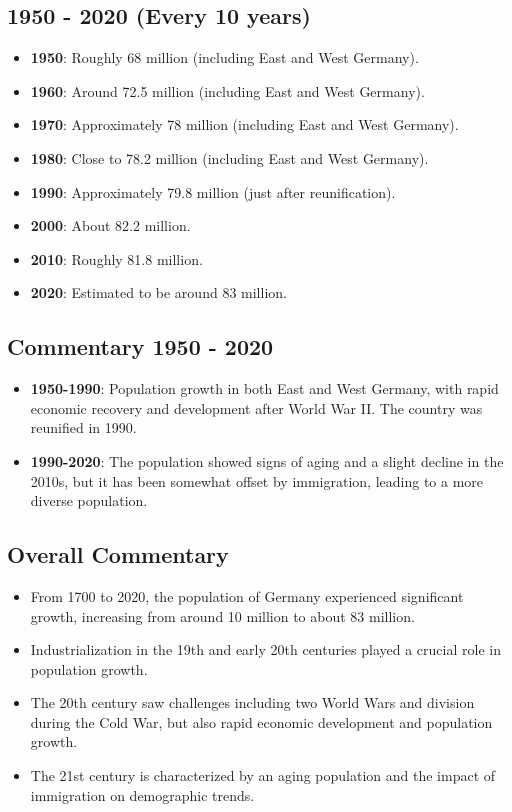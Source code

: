\subsection*{1950 - 2020 (Every 10 years)}
\begin{itemize}
    \item \textbf{1950}: Roughly 68 million (including East and West Germany).
    \item \textbf{1960}: Around 72.5 million (including East and West Germany).
    \item \textbf{1970}: Approximately 78 million (including East and West Germany).
    \item \textbf{1980}: Close to 78.2 million (including East and West Germany).
    \item \textbf{1990}: Approximately 79.8 million (just after reunification).
    \item \textbf{2000}: About 82.2 million.
    \item \textbf{2010}: Roughly 81.8 million.
    \item \textbf{2020}: Estimated to be around 83 million.
\end{itemize}

\subsection*{Commentary 1950 - 2020}
\begin{itemize}
    \item \textbf{1950-1990}: Population growth in both East and West Germany, with rapid economic recovery and development after World War II. The country was reunified in 1990.
    \item \textbf{1990-2020}: The population showed signs of aging and a slight decline in the 2010s, but it has been somewhat offset by immigration, leading to a more diverse population.
\end{itemize}

\subsection*{Overall Commentary}
\begin{itemize}
    \item From 1700 to 2020, the population of Germany experienced significant growth, increasing from around 10 million to about 83 million.
    \item Industrialization in the 19th and early 20th centuries played a crucial role in population growth.
    \item The 20th century saw challenges including two World Wars and division during the Cold War, but also rapid economic development and population growth.
    \item The 21st century is characterized by an aging population and the impact of immigration on demographic trends.
\end{itemize}
